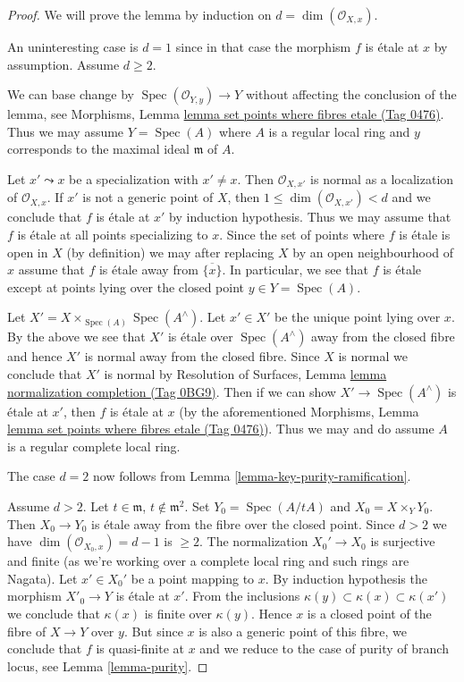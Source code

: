 \documentclass{amsart}
\theoremstyle{plain}
\theoremstyle{definition}
\theoremstyle{remark}
\numberwithin{equation}{subsection}
\def\Spec{\mathop{\mathrm{Spec}}}
\begin{document}
\begin{proof}
We will prove the lemma by induction on $d = \dim(\mathcal{O}_{X, x})$.

\medskip\noindent
An uninteresting case is $d = 1$ since in that case the morphism
$f$ is \'etale at $x$ by assumption. Assume $d \geq 2$.

\medskip\noindent
We can base change by $\Spec(\mathcal{O}_{Y, y}) \to Y$
without affecting the conclusion of the lemma, see
Morphisms, Lemma \href{https://stacks.math.columbia.edu/tag/0476}{lemma set points where fibres etale (Tag 0476)}.
Thus we may assume $Y = \Spec(A)$ where $A$ is a regular local
ring and $y$ corresponds to the maximal ideal $\mathfrak m$ of $A$.

\medskip\noindent
Let $x' \leadsto x$ be a specialization with $x' \not = x$.
Then $\mathcal{O}_{X, x'}$ is normal as a localization of
$\mathcal{O}_{X, x}$. If $x'$ is not a generic point of $X$,
then $1 \leq \dim(\mathcal{O}_{X, x'}) < d$ and we conclude that
$f$ is \'etale at $x'$ by induction hypothesis.
Thus we may assume that $f$ is \'etale at all points specializing to
$x$. Since the set of points where $f$ is \'etale is open in $X$
(by definition) we may after replacing $X$ by an open neighbourhood of $x$
assume that $f$ is \'etale away from $\overline{\{x\}}$.
In particular, we see that $f$ is \'etale except at points
lying over the closed point $y \in Y = \Spec(A)$.

\medskip\noindent
Let $X' = X \times_{\Spec(A)} \Spec(A^\wedge)$. Let $x' \in X'$
be the unique point lying over $x$. By the above we see that
$X'$ is \'etale over $\Spec(A^\wedge)$ away from the closed fibre and
hence $X'$ is normal away from the closed fibre. Since $X$ is normal
we conclude that $X'$ is normal by
Resolution of Surfaces, Lemma \href{https://stacks.math.columbia.edu/tag/0BG9}{lemma normalization completion (Tag 0BG9)}.
Then if we can show $X' \to \Spec(A^\wedge)$ is \'etale at $x'$,
then $f$ is \'etale at $x$ (by the aforementioned
Morphisms, Lemma \href{https://stacks.math.columbia.edu/tag/0476}{lemma set points where fibres etale (Tag 0476)}).
Thus we may and do assume $A$ is a regular complete local ring.

\medskip\noindent
The case $d = 2$ now follows from Lemma \ref{lemma-key-purity-ramification}.

\medskip\noindent
Assume $d > 2$. Let $t \in \mathfrak m$, $t \not \in \mathfrak m^2$.
Set $Y_0 = \Spec(A/tA)$ and $X_0 = X \times_Y Y_0$.
Then $X_0 \to Y_0$ is \'etale away from the fibre over the closed point.
Since $d > 2$ we have $\dim(\mathcal{O}_{X_0, x}) = d - 1$ is $\geq 2$.
The normalization $X_0' \to X_0$ is surjective and finite
(as we're working over a complete local ring and such rings are Nagata).
Let $x' \in X_0'$ be a point mapping to $x$. By induction hypothesis the
morphism $X'_0 \to Y$ is \'etale at $x'$. From the inclusions
$\kappa(y) \subset \kappa(x) \subset \kappa(x')$
we conclude that $\kappa(x)$ is finite over $\kappa(y)$.
Hence $x$ is a closed point of the fibre of $X \to Y$
over $y$. But since $x$ is also a generic point of
this fibre, we conclude that $f$ is quasi-finite at $x$
and we reduce to the case of purity of branch locus, see
Lemma \ref{lemma-purity}.
\end{proof}
\end{document}
